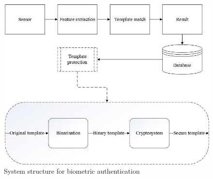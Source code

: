 
\begin{figure}[htbp!] 
\centering    
\includegraphics[width=1.0\textwidth]{Chapter2/Figs/System_structure_for_biometric_authentication.jpg}
\caption[System structure for biometric authentication]{System structure for biometric authentication}
\label{fig:System structure for biometric authentication}
\end{figure}

